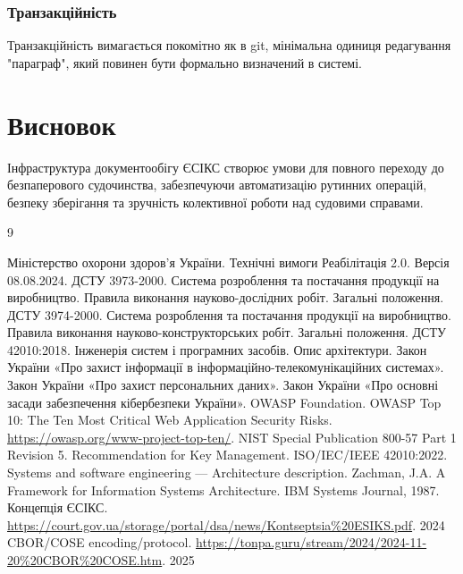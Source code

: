 \documentclass{article}
\begin{document}
\subsubsection{Транзакційність}
Транзакційність вимагається покомітно як в git, мінімальна одиниця редагування "параграф",
який повинен бути формально визначений в системі.

\newpage
\section*{Висновок}
Інфраструктура документообігу ЄСІКС створює умови для повного переходу до безпаперового судочинства, забезпечуючи автоматизацію рутинних операцій, безпеку зберігання та зручність колективної роботи над судовими справами.

\begin{thebibliography}{9}

 Міністерство охорони здоров’я України. \newblock Технічні вимоги Реабілітація 2.0. \newblock Версія 08.08.2024.
 ДСТУ 3973-2000. \newblock Система розроблення та постачання продукції на виробництво. Правила виконання науково-дослідних робіт. Загальні положення.
 ДСТУ 3974-2000. \newblock Система розроблення та постачання продукції на виробництво. Правила виконання науково-конструкторських робіт. Загальні положення.
 ДСТУ 42010:2018. \newblock Інженерія систем і програмних засобів. Опис архітектури.
 Закон України «Про захист інформації в інформаційно-телекомунікаційних системах».
 Закон України «Про захист персональних даних».
 Закон України «Про основні засади забезпечення кібербезпеки України».
 OWASP Foundation. \newblock OWASP Top 10: The Ten Most Critical Web Application Security Risks. \newblock \url{https://owasp.org/www-project-top-ten/}.
 NIST Special Publication 800-57 Part 1 Revision 5. \newblock Recommendation for Key Management.
 ISO/IEC/IEEE 42010:2022. \newblock Systems and software engineering — Architecture description.
 Zachman, J.A. \newblock A Framework for Information Systems Architecture. \newblock IBM Systems Journal, 1987.
 Концепція ЄСІКС. \url{https://court.gov.ua/storage/portal/dsa/news/Kontseptsia%20ESIKS.pdf}. 2024
 CBOR/COSE encoding/protocol. \url{https://tonpa.guru/stream/2024/2024-11-20%20CBOR%20COSE.htm}. 2025

\end{thebibliography}
\end{document}
